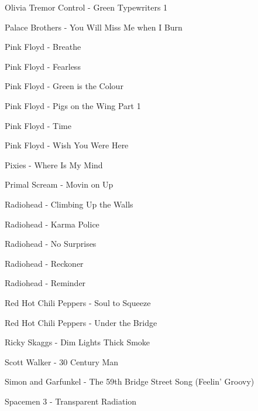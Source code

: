 Olivia Tremor Control - Green Typewriters 1 \dotfill \pageref{Green Typewriters 1 - Olivia Tremor Control} 

Palace Brothers - You Will Miss Me when I Burn \dotfill \pageref{You Will Miss Me when I Burn - Palace Brothers} 

Pink Floyd - Breathe \dotfill \pageref{Breathe - Pink Floyd} 

Pink Floyd - Fearless \dotfill \pageref{Fearless - Pink Floyd} 

Pink Floyd - Green is the Colour \dotfill \pageref{Green is the Colour - Pink Floyd} 

Pink Floyd - Pigs on the Wing Part 1 \dotfill \pageref{Pigs on the Wing Part 1 - Pink Floyd} 

Pink Floyd - Time \dotfill \pageref{Time - Pink Floyd} 

Pink Floyd - Wish You Were Here \dotfill \pageref{Wish You Were Here - Pink Floyd} 

Pixies - Where Is My Mind \dotfill \pageref{Where Is My Mind - Pixies} 

Primal Scream - Movin on Up \dotfill \pageref{Movin on Up - Primal Scream} 

Radiohead - Climbing Up the Walls \dotfill \pageref{Climbing Up the Walls - Radiohead} 

Radiohead - Karma Police \dotfill \pageref{Karma Police - Radiohead} 

Radiohead - No Surprises \dotfill \pageref{No Surprises - Radiohead} 

Radiohead - Reckoner \dotfill \pageref{Reckoner - Radiohead} 

Radiohead - Reminder \dotfill \pageref{Reminder - Radiohead} 

Red Hot Chili Peppers - Soul to Squeeze \dotfill \pageref{Soul to Squeeze - Red Hot Chili Peppers} 

Red Hot Chili Peppers - Under the Bridge \dotfill \pageref{Under the Bridge - Red Hot Chili Peppers} 

Ricky Skaggs - Dim Lights Thick Smoke \dotfill \pageref{Dim Lights Thick Smoke - Ricky Skaggs} 

Scott Walker - 30 Century Man \dotfill \pageref{30 Century Man - Scott Walker} 

Simon and Garfunkel - The 59th Bridge Street Song (Feelin' Groovy) \dotfill \pageref{The 59th Bridge Street Song (Feelin' Groovy) - Simon and Garfunkel} 

Spacemen 3 - Transparent Radiation \dotfill \pageref{Transparent Radiation - Spacemen 3} 

